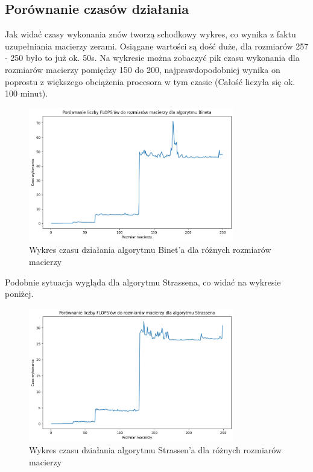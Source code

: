 \documentclass{article}
\begin{document}
\subsection{Porównanie czasów działania}

Jak widać czasy wykonania znów tworzą schodkowy wykres, co wynika z faktu uzupełniania macierzy zerami. Osiągane wartości są dość duże, dla rozmiarów 257 - 250 było to już ok. 50s. Na wykresie można zobaczyć pik czasu wykonania dla rozmiarów macierzy pomiędzy 150 do 200, najprawdopodobniej wynika on poprostu z większego obciążenia procesora w tym czasie (Całość liczyła się ok. 100 minut). 

\begin{figure}[H]
  \centering
    \includegraphics[width=0.8\textwidth]{images/binet_runtime.png}
  \caption{Wykres czasu działania algorytmu Binet'a dla różnych rozmiarów macierzy}
\end{figure}

\noindent
Podobnie sytuacja wygląda dla algorytmu Strassena, co widać na wykresie poniżej.

\begin{figure}[H]
  \centering
    \includegraphics[width=0.8\textwidth]{images/strassen_runtime.png}
  \caption{Wykres czasu działania algorytmu Strassen'a dla różnych rozmiarów macierzy}
\end{figure}
\end{document}
